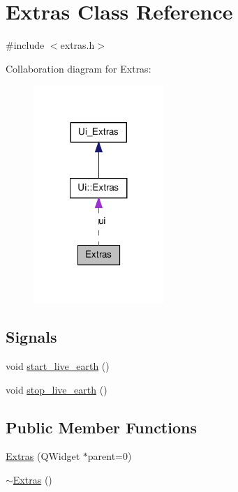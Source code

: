 \hypertarget{classExtras}{
\section{Extras Class Reference}
\label{classExtras}
}


{\ttfamily \#include $<$extras.h$>$}



Collaboration diagram for Extras:
\nopagebreak
\begin{figure}[H]
\begin{center}
\leavevmode
\includegraphics[width=140pt]{classExtras__coll__graph}
\end{center}
\end{figure}
\subsection*{Signals}
\begin{DoxyCompactItemize}
\item 
void \hyperlink{classExtras_a0f662eb3d01932eb602b021add0951a0}{start\_\-live\_\-earth} ()
\item 
void \hyperlink{classExtras_a7b9c6ee6b1f93b43eae14f399554d68d}{stop\_\-live\_\-earth} ()
\end{DoxyCompactItemize}
\subsection*{Public Member Functions}
\begin{DoxyCompactItemize}
\item 
\hyperlink{classExtras_ac0a6027f472204fc979ae9a6f1351c3c}{Extras} (QWidget $\ast$parent=0)
\item 
\hyperlink{classExtras_ac12989edf6c9083852250d271b8b460d}{$\sim$Extras} ()
\end{DoxyCompactItemize}


